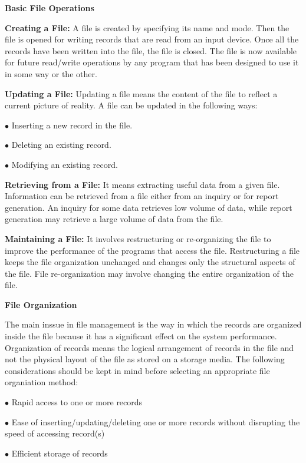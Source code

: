 \filbreak
\vskip 1cm
{\bf Basic File Operations}

\vskip 3mm
{\bf Creating a File:} A file is created by specifying its name and mode. Then the file is opened for writing records that are read from an input device. Once all the records have been written into the file, the file is closed. The file is now available for future read/write operations by any program that has been designed to use it in some way or the other.

\vskip 3mm
{\bf Updating a File:} Updating a file means the content of the file to reflect a current picture of reality. A file can be updated in the following ways:

\vskip 3mm
\qquad$\bullet$ Inserting a new record in the file.

\vskip 3mm
\qquad$\bullet$ Deleting an existing record.

\vskip 3mm
\qquad$\bullet$ Modifying an existing record.

\vskip 3mm
{\bf Retrieving from a File:} It means extracting useful data from a given file. Information can be retrieved from a file either from an inquiry or for report generation. An inquiry for some data retrieves low volume of data, while report generation may retrieve a large volume of data from the file.

\vskip 3mm
{\bf Maintaining a File:} It involves restructuring or re-organizing the file to improve the performance of the programs that access the file. Restructuring a file keeps the file organization unchanged and changes only the structural aspects of the file. File re-organization may involve changing the entire organization of the file.

\filbreak
\vskip 1cm
{\bf File Organization}

\vskip 1mm
The main inssue in file management is the way in which the records are organized inside the file because it has a significant effect on the system performance. Organization of records means the logical arrangement of records in the file and not the physical layout of the file as stored on a storage media. The following considerations should be kept in mind before selecting an appropriate file organiation method:

\vskip 3mm
\qquad$\bullet$ Rapid access to one or more records

\vskip 3mm
\qquad$\bullet$ Ease of inserting/updating/deleting one or more records without disrupting the speed of accessing record(s)

\vskip 3mm
\qquad$\bullet$ Efficient storage of records

